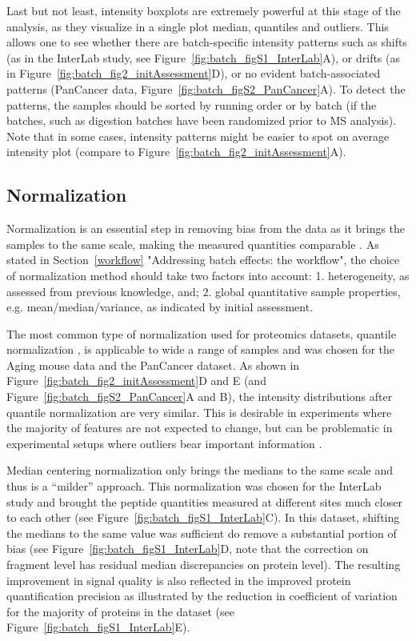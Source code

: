 \documentclass[num-refs]{wiley-article}
\begin{document}
Last but not least, intensity boxplots are extremely powerful at this stage of the analysis, as they visualize in a single plot median, quantiles and outliers. This allows one to see whether there are batch-specific intensity patterns such as shifts (as in the InterLab study, see Figure~\ref{fig:batch_figS1_InterLab}A), or drifts (as in Figure~\ref{fig:batch_fig2_initAssessment}D), or no evident batch-associated patterns (PanCancer data, Figure~\ref{fig:batch_figS2_PanCancer}A). To detect the patterns, the samples should be sorted by running order or by batch (if the batches, such as digestion batches have been randomized prior to MS analysis). Note that in some cases, intensity patterns might be easier to spot on average intensity plot (compare to Figure~\ref{fig:batch_fig2_initAssessment}A).

\subsection{Normalization}

Normalization is an essential step in removing bias from the data as it brings the samples to the same scale, making the measured quantities comparable \cite{Leek:2010aa}. As stated in Section~\ref{workflow} "Addressing batch effects: the workflow", the choice of normalization method should take two factors into account: 1. heterogeneity, as assessed from previous knowledge, and; 2. global quantitative sample properties, e.g. mean/median/variance, as indicated by initial assessment.

The most common type of normalization used for proteomics datasets, quantile normalization \cite{Bolstad2003}, is applicable to wide a range of samples and was chosen for the Aging mouse data and the PanCancer dataset. As shown in Figure~\ref{fig:batch_fig2_initAssessment}D and E (and Figure~\ref{fig:batch_figS2_PanCancer}A and B), the intensity distributions after quantile normalization are very similar.  This is desirable in experiments where the majority of features are not expected to change, but can be problematic in experimental setups where outliers bear important information \cite{Wang770115}.

Median centering normalization only brings the medians to the same scale and thus is a “milder” approach. This normalization was chosen for the InterLab study and brought the peptide quantities measured at different sites much closer to each other (see Figure~\ref{fig:batch_figS1_InterLab}C). In this dataset, shifting the medians to the same value was sufficient do remove a substantial portion of bias (see Figure~\ref{fig:batch_figS1_InterLab}D, note that the correction on fragment level has residual median discrepancies on protein level). The resulting improvement in signal quality is also reflected in the improved protein quantification precision as illustrated by the reduction in  coefficient of variation for the majority of proteins in the dataset (see Figure~\ref{fig:batch_figS1_InterLab}E).
\end{document}
